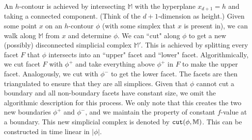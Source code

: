 \documentclass[11pt]{article}
\newcommand{\ignore}[1]{}
\theoremstyle{definition}
\newcommand{\MM}{\mathbb{M}}
\newcommand{\eps}{\varepsilon}
\newcommand{\cut}{{\tt cut}}
\begin{document}
An $h$-contour is achieved by intersecting $\MM$ with the hyperplane $x_{d+1} = h$ and taking a connected component. (Think of the $d+1$-dimension
as height.) Given some point $x$
on an $h$-contour $\phi$ (with some simplex that $x$ is present in), we can walk along $\MM$ from $x$ and determine $\phi$.
We can ``cut" along $\phi$ to get a new (possibly) disconnected simplicial complex $\MM'$. This is achieved
by splitting every facet $F$ that $\phi$ intersects into an ``upper" facet and ``lower" facet. Algorithmically,
we cut facet $F$ with $\phi^+$ and take everything above $\phi^+$ in $F$ to make the upper facet. Analogously, we cut with $\phi^-$ to get the lower facet.
The facets are then triangulated to ensure that they are all simplices.
Given that $\phi$ cannot cut a boundary and all non-boundary facets
have constant size, we omit the algorithmic description for this process. We only note that this
creates the two new boundaries $\phi^+$ and $\phi^-$, and we maintain the property of constant $f$-value at a boundary.
This new simplicial complex is denoted by $\cut(\phi,\MM)$.
This can be constructed in time linear in $|\phi|$.



\ignore{
\medskip
\fbox{
\begin{minipage}{0.9\textwidth}
{\bf $\cut(\phi,\MM)$}

\smallskip
\begin{asparaenum}
	\item For every edge $e$ that intersects $\phi$ at point $x$: add edges $(e,x^+)$ and $(e,x^-)$
	where $x^+$ (resp. $x^-$) is infinitesimally above (resp. below) $x$.
	\item Take a point $x$ (resp. $y$) on $e$ at distance $\eps$ above (resp. below) $\phi$.
	\item Let $\phi_x$ be the contour through $x$, and analogously define $\phi_y$. Insert a vertex
	at each intersection point of these contours with edges of $\MM$. Add  
	\item Delete the edges between $\phi_x$ and $\phi_y$.
\end{asparaenum}
\end{minipage}}

\medskip
This results in a new boundary critical simplicial complex. There are two new disjoint
boundary simplices added. The manifold may be disconnected. 
}
\end{document}
